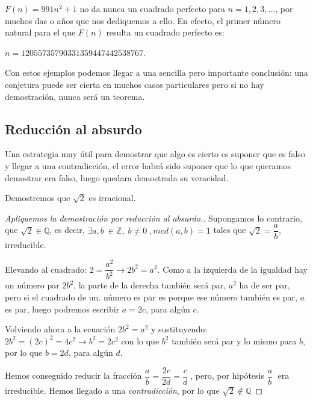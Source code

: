  	    \begin{ejem}
 			$F(n)=991n^2+1$ no da nunca un cuadrado perfecto para $n=1,2,3,...$, por muchos das o años que nos dediquemos a ello. En efecto, el primer número natural para el que $F(n)$ resulta un cuadrado perfecto es:
 			
 			$n=12055735790331359447442538767.$
 		\end{ejem}
 		
 		 Con estos ejemplos podemos llegar a una sencilla pero importante conclusión: una conjetura puede ser cierta en muchos casos particulares pero si no hay demostración, nunca será un teorema.
		
		
		\subsection{Reducción al absurdo}
		\label{reduc-absurd}
		
		\begin{axio}Una estrategia muy útil para demostrar que algo es cierto es suponer que es falso y llegar a una contradicción, el error habrá sido suponer que lo que queramos demostrar era falso, luego quedara demostrada su veracidad.	
		\end{axio}

		
		\begin{ejem}
			Demostremos que $\sqrt 2$ es irracional.
		\end{ejem}
		\begin{proof}[Apliquemos la demostración por reducción al absurdo.]
			
		Supongamos lo contrario, que $\sqrt 2\in \mathbb Q$, es decir, $\exists a, b\ \in \mathbb Z, \; b\neq 0\; , mcd(a,b)=1$ tales que $\sqrt 2 = \dfrac a b$, irreducible.
		
		Elevando al cuadrado: $2=\dfrac {a^2}{b^2} \to 2b^2=a^2$. Como a la izquierda de la igualdad hay un número par $2b^2$, la parte de la derecha también será par, $a^2$ ha de ser par, pero si el cuadrado de un. número es par es porque ese número también es par, $a$ es par, luego podremos escribir $a=2c$, para algún $c$.
		
		Volviendo ahora a la ecuación $2b^2=a^2$ y sustituyendo: $2b^2=(2c)^2=4c^2 \to b^2=2c^2$ con lo que $b^2$ también será par y lo mismo para $b$, por lo que $b=2d$, para algún $d$.
		
		Hemos conseguido reducir la fracción $\dfrac a b=\dfrac {2c}{2d}=\dfrac c d\; $, pero, por hipótesis $\dfrac a b\; $ era irreducible. Hemos llegado a una \emph{contradicción}, por lo que $\sqrt 2\notin \mathbb Q$
		\end{proof}
		
